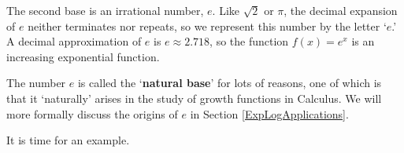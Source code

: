 \documentclass{ximera}
\begin{document}
 


The second base is an irrational number, $e$.  Like $\sqrt{2}$ or $\pi$, the decimal expansion of $e$ neither terminates nor repeats, so we represent this number by the letter `$e$.'  A decimal approximation of $e$ is $e \approx 2.718$, so the function $f(x) = e^{x}$ is an increasing exponential function.   

 

The number $e$ is called the `\textbf{natural base}' for lots of reasons, one of which is that it `naturally' arises in the study of growth functions in Calculus.  We will more formally discuss the origins of $e$  in Section \ref{ExpLogApplications}.

 
 
It is time for an example.
\end{document}
